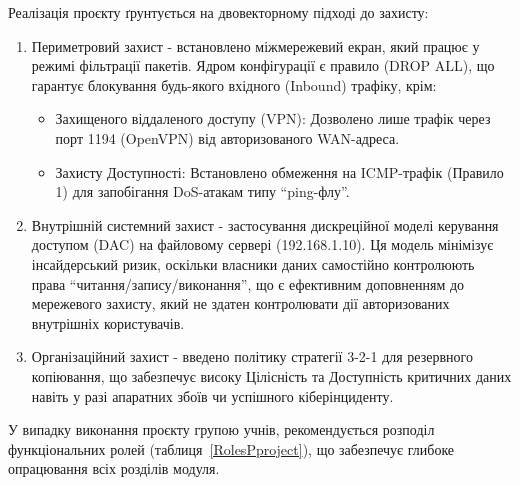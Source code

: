 Реалізація проєкту ґрунтується на двовекторному підході до захисту:
\begin{enumerate}
    \item Периметровий захист - встановлено міжмережевий екран, який працює у режимі фільтрації пакетів. Ядром конфігурації є правило (DROP ALL), що гарантує блокування будь-якого вхідного (Inbound) трафіку, крім:
    \begin{itemize}
        \item Захищеного віддаленого доступу (VPN): Дозволено лише трафік через порт 1194 (OpenVPN) від авторизованого WAN-адреса.
        \item Захисту Доступності: Встановлено обмеження на ICMP-трафік (Правило 1) для запобігання DoS-атакам типу ``ping-флу''.
    \end{itemize}
    \item Внутрішній системний захист - застосування дискреційної моделі керування доступом (DAC) на файловому сервері (192.168.1.10). Ця модель мінімізує інсайдерський ризик, оскільки власники даних самостійно контролюють права ``читання/запису/виконання'', що є ефективним доповненням до мережевого захисту, який не здатен контролювати дії авторизованих внутрішніх користувачів.
    \item Організаційний захист - введено політику стратегії 3-2-1 для резервного копіювання, що забезпечує високу Цілісність та Доступність критичних даних навіть у разі апаратних збоїв чи успішного кіберінциденту.
\end{enumerate}

У випадку виконання проєкту групою учнів, рекомендується розподіл функціональних ролей (таблиця~\ref{RolesPproject}), що забезпечує глибоке опрацювання всіх розділів модуля.

